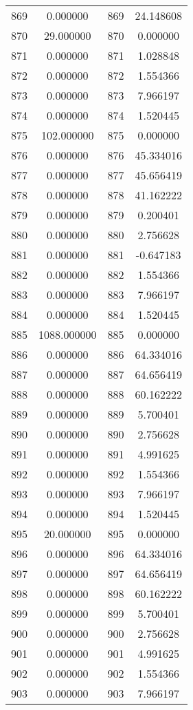 \documentclass[12pt]{article}
\begin{document}
\begin{longtable}{@{}cccc@{}}
869 & 0.000000 & 869 & 24.148608 \\
870 & 29.000000 & 870 & 0.000000 \\
871 & 0.000000 & 871 & 1.028848 \\
872 & 0.000000 & 872 & 1.554366 \\
873 & 0.000000 & 873 & 7.966197 \\
874 & 0.000000 & 874 & 1.520445 \\
875 & 102.000000 & 875 & 0.000000 \\
876 & 0.000000 & 876 & 45.334016 \\
877 & 0.000000 & 877 & 45.656419 \\
878 & 0.000000 & 878 & 41.162222 \\
879 & 0.000000 & 879 & 0.200401 \\
880 & 0.000000 & 880 & 2.756628 \\
881 & 0.000000 & 881 & -0.647183 \\
882 & 0.000000 & 882 & 1.554366 \\
883 & 0.000000 & 883 & 7.966197 \\
884 & 0.000000 & 884 & 1.520445 \\
885 & 1088.000000 & 885 & 0.000000 \\
886 & 0.000000 & 886 & 64.334016 \\
887 & 0.000000 & 887 & 64.656419 \\
888 & 0.000000 & 888 & 60.162222 \\
889 & 0.000000 & 889 & 5.700401 \\
890 & 0.000000 & 890 & 2.756628 \\
891 & 0.000000 & 891 & 4.991625 \\
892 & 0.000000 & 892 & 1.554366 \\
893 & 0.000000 & 893 & 7.966197 \\
894 & 0.000000 & 894 & 1.520445 \\
895 & 20.000000 & 895 & 0.000000 \\
896 & 0.000000 & 896 & 64.334016 \\
897 & 0.000000 & 897 & 64.656419 \\
898 & 0.000000 & 898 & 60.162222 \\
899 & 0.000000 & 899 & 5.700401 \\
900 & 0.000000 & 900 & 2.756628 \\
901 & 0.000000 & 901 & 4.991625 \\
902 & 0.000000 & 902 & 1.554366 \\
903 & 0.000000 & 903 & 7.966197 \\

\end{longtable}
\end{document}
